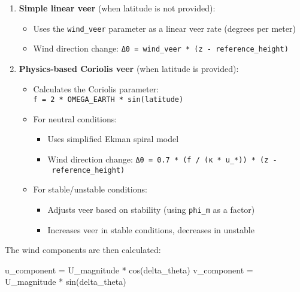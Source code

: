 \documentclass[
]{article}
\newenvironment{Shaded}{}{}
\newcommand{\NormalTok}[1]{#1}
\newcommand{\OperatorTok}[1]{\textcolor[rgb]{0.40,0.40,0.40}{#1}}
\providecommand{\tightlist}{%
  \setlength{\itemsep}{0pt}\setlength{\parskip}{0pt}}
\begin{document}
\begin{enumerate}
\def\labelenumi{\arabic{enumi}.}
\tightlist
\item
  \textbf{Simple linear veer} (when latitude is not provided):

  \begin{itemize}
  \tightlist
  \item
    Uses the \texttt{wind\_veer} parameter as a linear veer rate
    (degrees per meter)
  \item
    Wind direction change:
    \texttt{Δθ\ =\ wind\_veer\ *\ (z\ -\ reference\_height)}
  \end{itemize}
\item
  \textbf{Physics-based Coriolis veer} (when latitude is provided):

  \begin{itemize}
  \tightlist
  \item
    Calculates the Coriolis parameter:
    \texttt{f\ =\ 2\ *\ OMEGA\_EARTH\ *\ sin(latitude)}
  \item
    For neutral conditions:

    \begin{itemize}
    \tightlist
    \item
      Uses simplified Ekman spiral model
    \item
      Wind direction change:
      \texttt{Δθ\ =\ 0.7\ *\ (f\ /\ (κ\ *\ u\_*))\ *\ (z\ -\ reference\_height)}
    \end{itemize}
  \item
    For stable/unstable conditions:

    \begin{itemize}
    \tightlist
    \item
      Adjusts veer based on stability (using \texttt{phi\_m} as a
      factor)
    \item
      Increases veer in stable conditions, decreases in unstable
    \end{itemize}
  \end{itemize}
\end{enumerate}

The wind components are then calculated:

\begin{Shaded}
\begin{Highlighting}[]
\NormalTok{u\_component }\OperatorTok{=}\NormalTok{ U\_magnitude }\OperatorTok{*}\NormalTok{ cos(delta\_theta)}
\NormalTok{v\_component }\OperatorTok{=}\NormalTok{ U\_magnitude }\OperatorTok{*}\NormalTok{ sin(delta\_theta)}
\end{Highlighting}
\end{Shaded}
\end{document}
